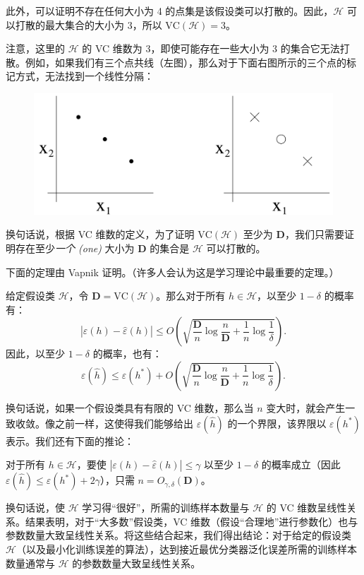 此外，可以证明不存在任何大小为 4 的点集是该假设类可以打散的。因此，$\mathcal{H}$ 可以打散的最大集合的大小为 3，所以 $\text{VC}(\mathcal{H}) = 3$。

注意，这里的 $\mathcal{H}$ 的 VC 维数为 3，即使可能存在一些大小为 3 的集合它无法打散。例如，如果我们有三个点共线（左图），那么对于下面右图所示的三个点的标记方式，无法找到一个线性分隔：

\begin{figure}[H]
    \centering
    \includegraphics[width=0.9\linewidth]{figs/three_points_cant_shatter.png}
\end{figure}

换句话说，根据 VC 维数的定义，为了证明 $\text{VC}(\mathcal{H})$ 至少为 $\mathbf{D}$，我们只需要证明存在至少\textit{一个 (one)} 大小为 $\mathbf{D}$ 的集合是 $\mathcal{H}$ 可以打散的。

下面的定理由 Vapnik 证明。（许多人会认为这是学习理论中最重要的定理。）

\begin{theorem*}
    给定假设类 $\mathcal{H}$，令 $\mathbf{D} = \text{VC}(\mathcal{H})$。那么对于所有 $h \in \mathcal{H}$，以至少 $1-\delta$ 的概率有：
    \[
        |\varepsilon(h) - \hat{\varepsilon}(h)| \leq O\left(\sqrt{\frac{\mathbf{D}}{n} \log \frac{n}{\mathbf{D}} + \frac{1}{n} \log \frac{1}{\delta}}\right).
    \]
    因此，以至少 $1-\delta$ 的概率，也有：
    \[
        \varepsilon(\hat{h}) \leq \varepsilon(h^*) + O\left(\sqrt{\frac{\mathbf{D}}{n} \log \frac{n}{\mathbf{D}} + \frac{1}{n} \log \frac{1}{\delta}}\right).
    \]
\end{theorem*}

换句话说，如果一个假设类具有有限的 VC 维数，那么当 $n$ 变大时，就会产生一致收敛。像之前一样，这使得我们能够给出 $\varepsilon(\hat{h})$ 的一个界限，该界限以 $\varepsilon(h^*)$ 表示。我们还有下面的推论：

\begin{corollary*}
    对于所有 $h \in \mathcal{H}$，要使 $|\varepsilon(h) - \hat{\varepsilon}(h)| \leq \gamma$ 以至少 $1-\delta$ 的概率成立（因此 $\varepsilon(\hat{h}) \leq \varepsilon(h^*) + 2\gamma$），只需 $n = O_{\gamma, \delta}(\mathbf{D})$。
\end{corollary*}

换句话说，使 $\mathcal{H}$ 学习得“很好”，所需的训练样本数量与 $\mathcal{H}$ 的 VC 维数呈线性关系。结果表明，对于“大多数”假设类，VC 维数（假设“合理地”进行参数化）也与参数数量大致呈线性关系。将这些结合起来，我们得出结论：对于给定的假设类 $\mathcal{H}$（以及最小化训练误差的算法），达到接近最优分类器泛化误差所需的训练样本数量通常与 $\mathcal{H}$ 的参数数量大致呈线性关系。
